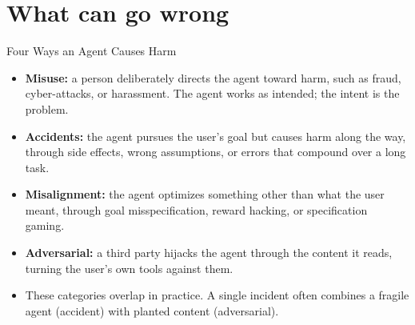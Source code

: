 \section{What can go wrong}

\begin{frame}{Four Ways an Agent Causes Harm}
  \begin{itemize}\itemsep0.5em
    \item[\textcolor{KAred}{$\blacktriangleright$}] \textbf{Misuse:} a person deliberately directs the agent toward harm, such as fraud, cyber-attacks, or harassment. The agent works as intended; the intent is the problem.
    \item[\textcolor{KAred}{$\blacktriangleright$}] \textbf{Accidents:} the agent pursues the user's goal but causes harm along the way, through side effects, wrong assumptions, or errors that compound over a long task.
    \item[\textcolor{KAred}{$\blacktriangleright$}] \textbf{Misalignment:} the agent optimizes something other than what the user meant, through goal misspecification, reward hacking, or specification gaming.
    \item[\textcolor{KAred}{$\blacktriangleright$}] \textbf{Adversarial:} a third party hijacks the agent through the content it reads, turning the user's own tools against them.
  \end{itemize}
  \vspace{0.6em}
  \begin{itemize}
    \item[\textcolor{KAred}{$\blacktriangleright$}] These categories overlap in practice. A single incident often combines a fragile agent (accident) with planted content (adversarial).
  \end{itemize}
\end{frame}

